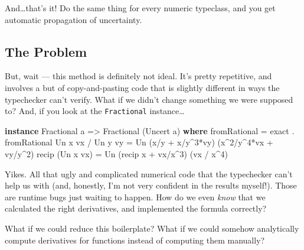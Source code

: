 \documentclass[]{article}
\newenvironment{Shaded}{}{}
\newcommand{\DataTypeTok}[1]{\textcolor[rgb]{0.56,0.13,0.00}{#1}}
\newcommand{\DecValTok}[1]{\textcolor[rgb]{0.25,0.63,0.44}{#1}}
\newcommand{\FunctionTok}[1]{\textcolor[rgb]{0.02,0.16,0.49}{#1}}
\newcommand{\KeywordTok}[1]{\textcolor[rgb]{0.00,0.44,0.13}{\textbf{#1}}}
\newcommand{\NormalTok}[1]{#1}
\newcommand{\OperatorTok}[1]{\textcolor[rgb]{0.40,0.40,0.40}{#1}}
\newcommand{\OtherTok}[1]{\textcolor[rgb]{0.00,0.44,0.13}{#1}}
\begin{document}
And\ldots that's it! Do the same thing for every numeric typeclass, and you get
automatic propagation of uncertainty.

\hypertarget{the-problem}{%
\subsection{The Problem}\label{the-problem}}

But, wait --- this method is definitely not ideal. It's pretty repetitive, and
involves a but of copy-and-pasting code that is slightly different in ways the
typechecker can't verify. What if we didn't change something we were supposed
to? And, if you look at the \texttt{Fractional} instance\ldots{}

\begin{Shaded}
\begin{Highlighting}[]
\KeywordTok{instance} \DataTypeTok{Fractional}\NormalTok{ a }\OtherTok{=>} \DataTypeTok{Fractional}\NormalTok{ (}\DataTypeTok{Uncert}\NormalTok{ a) }\KeywordTok{where}
    \FunctionTok{fromRational}      \OtherTok{=}\NormalTok{ exact }\OperatorTok{.} \FunctionTok{fromRational}
    \DataTypeTok{Un}\NormalTok{ x vx }\OperatorTok{/} \DataTypeTok{Un}\NormalTok{ y vy }\OtherTok{=} \DataTypeTok{Un}\NormalTok{ (x}\OperatorTok{/}\NormalTok{y }\OperatorTok{+}\NormalTok{ x}\OperatorTok{/}\NormalTok{y}\OperatorTok{\^{}}\DecValTok{3}\OperatorTok{*}\NormalTok{vy)   (x}\OperatorTok{\^{}}\DecValTok{2}\OperatorTok{/}\NormalTok{y}\OperatorTok{\^{}}\DecValTok{4}\OperatorTok{*}\NormalTok{vx }\OperatorTok{+}\NormalTok{ vy}\OperatorTok{/}\NormalTok{y}\OperatorTok{\^{}}\DecValTok{2}\NormalTok{)}
    \FunctionTok{recip}\NormalTok{ (}\DataTypeTok{Un}\NormalTok{ x vx)   }\OtherTok{=} \DataTypeTok{Un}\NormalTok{ (}\FunctionTok{recip}\NormalTok{ x }\OperatorTok{+}\NormalTok{ vx}\OperatorTok{/}\NormalTok{x}\OperatorTok{\^{}}\DecValTok{3}\NormalTok{) (vx }\OperatorTok{/}\NormalTok{ x}\OperatorTok{\^{}}\DecValTok{4}\NormalTok{)}
\end{Highlighting}
\end{Shaded}

Yikes. All that ugly and complicated numerical code that the typechecker can't
help us with (and, honestly, I'm not very confident in the results myself!).
Those are runtime bugs just waiting to happen. How do we even \emph{know} that
we calculated the right derivatives, and implemented the formula correctly?

What if we could reduce this boilerplate? What if we could somehow analytically
compute derivatives for functions instead of computing them manually?
\end{document}
